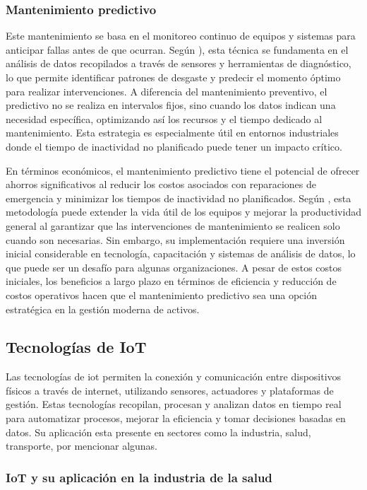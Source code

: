 \subsubsection{Mantenimiento predictivo}
Este mantenimiento se basa en el monitoreo continuo de equipos y sistemas para anticipar fallas antes de que ocurran. Según \citep{Mobley2002}), esta técnica se fundamenta en el análisis de datos recopilados a través de sensores y herramientas de diagnóstico, lo que permite identificar patrones de desgaste y predecir el momento óptimo para realizar intervenciones. A diferencia del mantenimiento preventivo, el predictivo no se realiza en intervalos fijos, sino cuando los datos indican una necesidad específica, optimizando así los recursos y el tiempo dedicado al mantenimiento. Esta estrategia es especialmente útil en entornos industriales donde el tiempo de inactividad no planificado puede tener un impacto crítico.

En términos económicos, el mantenimiento predictivo tiene el potencial de ofrecer ahorros significativos al reducir los costos asociados con reparaciones de emergencia y minimizar los tiempos de inactividad no planificados. Según \cite{Jardine2006}, esta metodología puede extender la vida útil de los equipos y mejorar la productividad general al garantizar que las intervenciones de mantenimiento se realicen solo cuando son necesarias. Sin embargo, su implementación requiere una inversión inicial considerable en tecnología, capacitación y sistemas de análisis de datos, lo que puede ser un desafío para algunas organizaciones. A pesar de estos costos iniciales, los beneficios a largo plazo en términos de eficiencia y reducción de costos operativos hacen que el mantenimiento predictivo sea una opción estratégica en la gestión moderna de activos.


\subsection{Tecnologías de IoT}
Las tecnologías de \acrfull{iot} permiten la conexión y comunicación entre dispositivos físicos a través de internet, utilizando sensores, actuadores y plataformas de gestión. Estas tecnologías recopilan, procesan y analizan datos en tiempo real para automatizar procesos, mejorar la eficiencia y tomar decisiones basadas en datos. Su aplicación esta presente en sectores como la industria, salud, transporte, por mencionar algunas.

\subsubsection{IoT y su aplicación en la industria de la salud}

